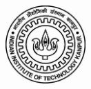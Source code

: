 \documentclass[11pt,a4paper,sans]{moderncv}
\title{}  %
\begin{document}
\hypersetup{
    linkcolor=blue,
    filecolor=magenta,      
    urlcolor=cyan,
}

\noindent
\begin{minipage}{.78\textwidth}
 \makecvtitle
\end{minipage}%
\begin{minipage}{.30\textwidth}
  \centering
  \includegraphics[height=3cm]{logo.jpg}
\end{minipage}
\vspace{-1em}

\end{document}
